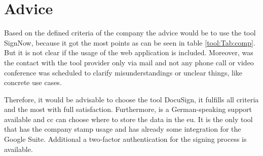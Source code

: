 \section{Advice}
Based on the defined criteria of the company the advice would be to use the tool SignNow, because it got the most points as can be seen in table \ref{tool:Tab:comp}. But it is not clear if the usage of the web application is included. Moreover, was the contact with the tool provider only via mail and not any phone call or video conference was scheduled to clarify misunderstandings or unclear things, like concrete use cases. 

Therefore, it would be advisable to choose the tool DocuSign, it fulfills all criteria and the most with full satisfaction. Furthermore, is a German-speaking support available and \gls{cc} can choose where to store the data in the \gls{eu}. It is the only tool that has the company stamp usage and has already some integration for the Google Suite. Additional a two-factor authentication for the signing process is available. 